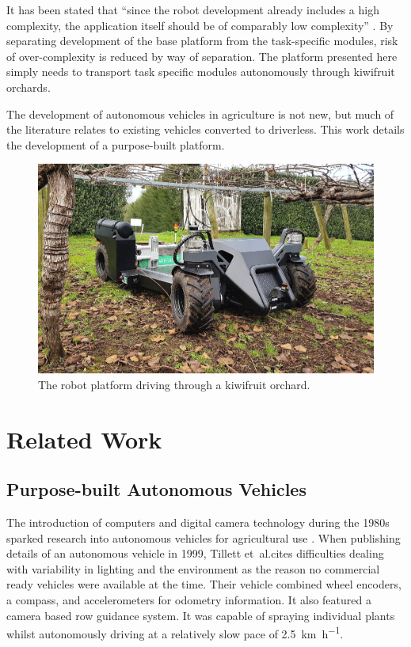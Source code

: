 \documentclass[preprint,authoryear,12pt]{elsarticle}
\begin{document}
    It has been stated that ``since the robot development already includes a high complexity, the application itself should be of comparably low complexity'' \citep{Ruckelshausen2009}.
    By separating development of the base platform from the task-specific modules, risk of over-complexity is reduced by way of separation.
    The platform presented here simply needs to transport task specific modules autonomously through kiwifruit orchards.

    The development of autonomous vehicles in agriculture is not new, but much of the literature relates to existing vehicles converted to driverless.
    This work details the development of a purpose-built platform.

    \begin{figure}[htb]
        \centering
        \includegraphics[width=\linewidth]{imgs/photos/suzy_general.jpg}
        \caption{
            The robot platform driving through a kiwifruit orchard.
        }
        \label{fig:suzy}
    \end{figure}

\section{Related Work}
\label{sect:review}

    \subsection{Purpose-built Autonomous Vehicles}

        The introduction of computers and digital camera technology during the 1980s sparked research into autonomous vehicles for agricultural use \citep{Li2009}.
        When publishing details of an autonomous vehicle in 1999, Tillett et~al.\@ cites difficulties dealing with variability in lighting and the environment as the reason no commercial ready vehicles were available at the time.
        Their vehicle combined wheel encoders, a compass, and accelerometers for odometry information.
        It also featured a camera based row guidance system.
        It was capable of spraying individual plants whilst autonomously driving at a relatively slow pace of \SI{2.5}{\kilo\meter\per\hour}.
\end{document}
